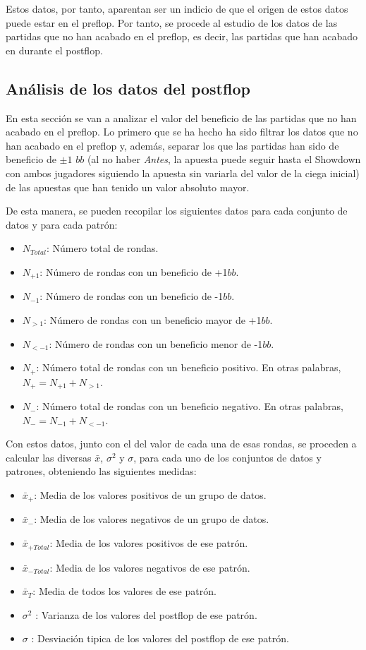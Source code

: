 Estos datos, por tanto, aparentan ser un indicio de que el origen de estos datos puede estar en el preflop. Por tanto, se procede al estudio de los datos de las partidas que no han acabado en el preflop, es decir, las partidas que han acabado en durante el postflop. 

\subsection{Análisis de los datos del postflop}

En esta sección se van a analizar el valor del beneficio de las partidas que no han acabado en el preflop. Lo primero que se ha hecho ha sido filtrar los datos que no han acabado en el preflop y, además, separar los que las partidas han sido de beneficio de $\pm1$ $bb$ (al no haber \textit{Antes}, la apuesta puede seguir hasta el Showdown con ambos jugadores siguiendo la apuesta sin variarla del valor de la ciega inicial) de las apuestas que han tenido un valor absoluto mayor.

De esta manera, se pueden recopilar los siguientes datos para cada conjunto de datos y para cada patrón:

\begin{itemize}
\item $N_{Total}$: Número total de rondas.
\item $N_{+1}$: Número de rondas con un beneficio de +1$bb$.
\item $N_{-1}$: Número de rondas con un beneficio de -1$bb$.
\item $N_{>1}$: Número de rondas con un beneficio mayor de +1$bb$.
\item $N_{<-1}$: Número de rondas con un beneficio menor de -1$bb$.
\item $N_{+}$: Número total de rondas con un beneficio positivo. En otras palabras,$N_{+}=N_{+1}+N_{>1}$.
\item $N_{-}$: Número total de rondas con un beneficio negativo. En otras palabras,$N_{-}=N_{-1}+N_{<-1}$.
\end{itemize}

Con estos datos, junto con el del valor de cada una de esas rondas, se proceden a calcular las diversas $\bar{x}$, $\sigma^2$ y $\sigma$, para cada uno de los conjuntos de datos y patrones, obteniendo las siguientes medidas:

\begin{itemize}
\item $\bar{x}_+$: Media de los valores positivos de un grupo de datos.
\item $\bar{x}_-$: Media de los valores negativos de un grupo de datos.
\item $\bar{x}_{+Total}$: Media de  los valores positivos de ese patrón.
\item $\bar{x}_{-Total}$: Media de los valores negativos  de ese patrón.
\item $\bar{x}_T$: Media de todos los valores de ese patrón.
\item $\sigma^2$ : Varianza de los valores del postflop de ese patrón.
\item $\sigma$ : Desviación tipica de los valores del postflop de ese patrón.
\end{itemize}


